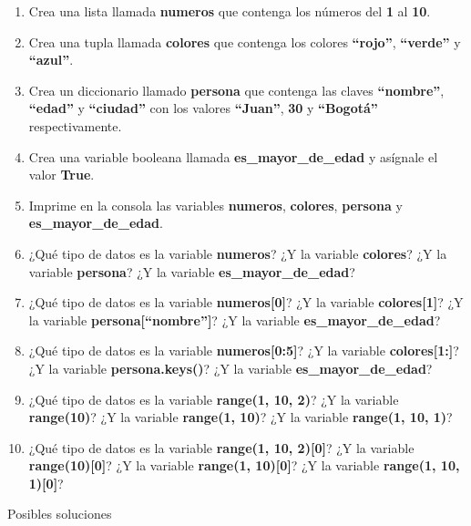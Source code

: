 \documentclass[
  a4paper,
  DIV=11,
  numbers=noendperiod,
  onepage,
  openany]{scrreprt}
\begin{document}
\begin{enumerate}
\def\labelenumi{\arabic{enumi}.}
\item
  Crea una lista llamada \textbf{numeros} que contenga los números del
  \textbf{1} al \textbf{10}.
\item
  Crea una tupla llamada \textbf{colores} que contenga los colores
  \textbf{``rojo''}, \textbf{``verde''} y \textbf{``azul''}.
\item
  Crea un diccionario llamado \textbf{persona} que contenga las claves
  \textbf{``nombre''}, \textbf{``edad''} y \textbf{``ciudad''} con los
  valores \textbf{``Juan''}, \textbf{30} y \textbf{``Bogotá''}
  respectivamente.
\item
  Crea una variable booleana llamada \textbf{es\_mayor\_de\_edad} y
  asígnale el valor \textbf{True}.
\item
  Imprime en la consola las variables \textbf{numeros},
  \textbf{colores}, \textbf{persona} y \textbf{es\_mayor\_de\_edad}.
\item
  ¿Qué tipo de datos es la variable \textbf{numeros}? ¿Y la variable
  \textbf{colores}? ¿Y la variable \textbf{persona}? ¿Y la variable
  \textbf{es\_mayor\_de\_edad}?
\item
  ¿Qué tipo de datos es la variable \textbf{numeros{[}0{]}}? ¿Y la
  variable \textbf{colores{[}1{]}}? ¿Y la variable
  \textbf{persona{[}``nombre''{]}}? ¿Y la variable
  \textbf{es\_mayor\_de\_edad}?
\item
  ¿Qué tipo de datos es la variable \textbf{numeros{[}0:5{]}}? ¿Y la
  variable \textbf{colores{[}1:{]}}? ¿Y la variable
  \textbf{persona.keys()}? ¿Y la variable \textbf{es\_mayor\_de\_edad}?
\item
  ¿Qué tipo de datos es la variable \textbf{range(1, 10, 2)}? ¿Y la
  variable \textbf{range(10)}? ¿Y la variable \textbf{range(1, 10)}? ¿Y
  la variable \textbf{range(1, 10, 1)}?
\item
  ¿Qué tipo de datos es la variable \textbf{range(1, 10, 2){[}0{]}}? ¿Y
  la variable \textbf{range(10){[}0{]}}? ¿Y la variable \textbf{range(1,
  10){[}0{]}}? ¿Y la variable \textbf{range(1, 10, 1){[}0{]}}?
\end{enumerate}

Posibles soluciones
\end{document}
